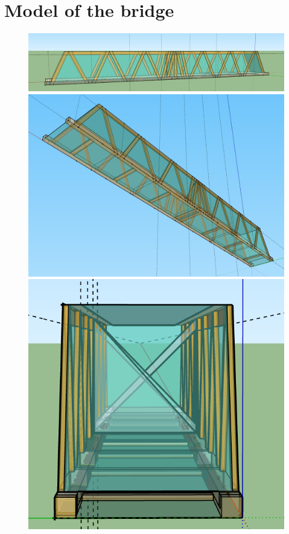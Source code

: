 \documentclass[paper=a4, fontsize=11pt]{scrartcl}
\numberwithin{equation}{section}		%
\numberwithin{figure}{section}			%
\numberwithin{table}{section}				%
\begin{document}
\section{Model of the bridge}
\begin{figure}[h!]
    \begin{center}
        \begin{minipage}{0.2\textwidth}
            \includegraphics[width=\textwidth]{Model1}
        \end{minipage}
        \begin{minipage}{0.2\textwidth}
            \includegraphics[width=\textwidth]{Model2}
        \end{minipage}
        \begin{minipage}{0.2\textwidth}
            \includegraphics[width=\textwidth]{Model3}

\end{minipage}
\end{center}
\end{figure}
\end{document}

